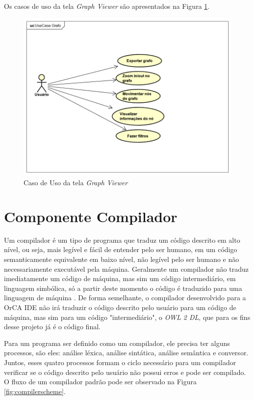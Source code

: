 \documentclass{bcc}
\begin{document}
Os casos de uso da tela \textit{Graph Viewer} são apresentados na Figura \ref{fig:ucgv}.

\begin{figure}[H]
\centering
\includegraphics[width=.7\textwidth]{Figuras/UseCaseGrafo.png}
\caption{Caso de Uso da tela \textit{Graph Viewer}} 
\label{fig:ucgv}
\end{figure}

\section{Componente Compilador}

Um compilador é um tipo de programa que traduz um código descrito em alto nível, ou seja, mais legível e fácil de entender pelo ser humano, em um código semanticamente equivalente em baixo nível, não legível pelo ser humano e não necessariamente executável pela máquina. Geralmente um compilador não traduz imediatamente um código de máquina, mas sim um código intermediário, em linguagem simbólica, só a partir deste momento o código é traduzido para uma linguagem de máquina \cite{grune2012}. De forma semelhante, o compilador desenvolvido para a OrCA IDE não irá traduzir o código descrito pelo usuário para um código de máquina, mas sim para um código "intermediário", o \textit{OWL 2 DL}, que para os fins desse projeto já é o código final.

Para um programa ser definido como um compilador, ele precisa ter alguns processos, são eles: análise léxica, análise sintática, análise semântica e conversor. Juntos, esses quatro processos formam  o ciclo necessário para um compilador verificar se o código descrito pelo usuário não possui erros e pode ser compilado. O fluxo de um compilador padrão pode ser observado na Figura \ref{fig:compilerscheme}.
\end{document}
